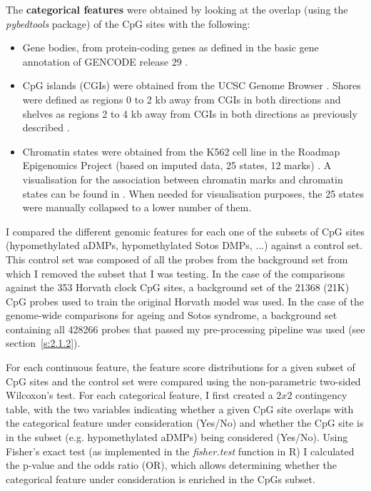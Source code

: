 The \textbf{categorical features} were obtained by looking at the overlap (using the \textit{pybedtools} package) \cite{Quinlan2011} of the CpG sites with the following:

\begin{itemize}
	
	\item Gene bodies, from protein-coding genes as defined in the basic gene annotation of GENCODE release 29 \cite{Frankish2018}.
	
	\item CpG islands (\acrshort{CGI}s) were obtained from the UCSC Genome Browser \cite{Bock2007}. Shores were defined as regions 0 to 2 kb away from CGIs in both directions and shelves as regions 2 to 4 kb away from CGIs in both directions as previously described \cite{Zhang2015,Martin-Herranz2017a}.
	
	\item Chromatin states were obtained from the K562 cell line in the Roadmap Epigenomics Project (based on imputed data, 25 states, 12 marks) \cite{Consortium}. A visualisation for the association between chromatin marks and chromatin states can be found in \cite{Consortiuma}. When needed for visualisation purposes, the 25 states were manually collapsed to a lower number of them.
	
\end{itemize}

I compared the different genomic features for each one of the subsets of CpG sites (hypomethylated aDMPs, hypomethylated Sotos DMPs, ...) against a control set. This control set was composed of all the probes from the background set from which I removed the subset that I was testing. In the case of the comparisons against the 353 Horvath clock CpG sites, a background set of the 21368 (21K) CpG probes used to train the original Horvath model \cite{Horvath2013} was used. In the case of the genome-wide comparisons for ageing and Sotos syndrome, a background set containing all 428266 probes that passed my pre-processing pipeline was used (see section~\ref{s:2.1.2}).

\bigskip

For each continuous feature, the feature score distributions for a given subset of CpG sites and the control set were compared using the non-parametric two-sided Wilcoxon's test. For each categorical feature, I first created a $2x2$ contingency table, with the two variables indicating whether a given CpG site overlaps with the categorical feature under consideration (Yes/No) and whether the CpG site is in the subset (e.g. hypomethylated aDMPs) being considered (Yes/No). Using Fisher's exact test (as implemented in the \textit{fisher.test} function in R) I calculated the p-value and the odds ratio (\acrshort{OR}), which allows determining whether the categorical feature under consideration is enriched in the CpGs subset. 

